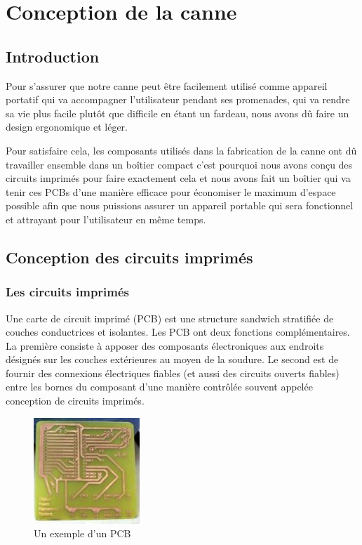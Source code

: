 \FloatBarrier

\section{Conception de la canne}

\subsection{Introduction}
Pour s’assurer que notre canne peut être facilement utilisé comme appareil portatif qui va accompagner l’utilisateur pendant ses promenades, qui va rendre sa vie plus facile plutôt que difficile en étant un fardeau, nous avons dû faire un design ergonomique et léger. 

Pour satisfaire cela, les composants utilisés dans la fabrication de la canne ont dû travailler ensemble dans un boîtier compact c’est pourquoi nous avons conçu des circuits imprimés pour faire exactement cela et nous avons fait un boîtier qui va tenir ces \acrshort{PCB}s d’une manière efficace pour économiser le maximum d’espace possible afin que nous puissions assurer un appareil portable qui sera fonctionnel et attrayant pour l’utilisateur en même temps.

\subsection{Conception des circuits imprimés}

\subsubsection{Les circuits imprimés}
Une carte de circuit imprimé (PCB) est une structure sandwich stratifiée de couches conductrices et isolantes. Les PCB ont deux fonctions complémentaires. La première consiste à apposer des composants électroniques aux endroits désignés sur les couches extérieures au moyen de la soudure. Le second est de fournir des connexions électriques fiables (et aussi des circuits ouverts fiables) entre les bornes du composant d’une manière contrôlée souvent appelée conception de circuits imprimés.

\begin{figure}[!htbp]
    \centering
    \includegraphics[width=4cm]{assets/conception1/img16.jpg}
    \caption{Un exemple d'un PCB}
\end{figure}


